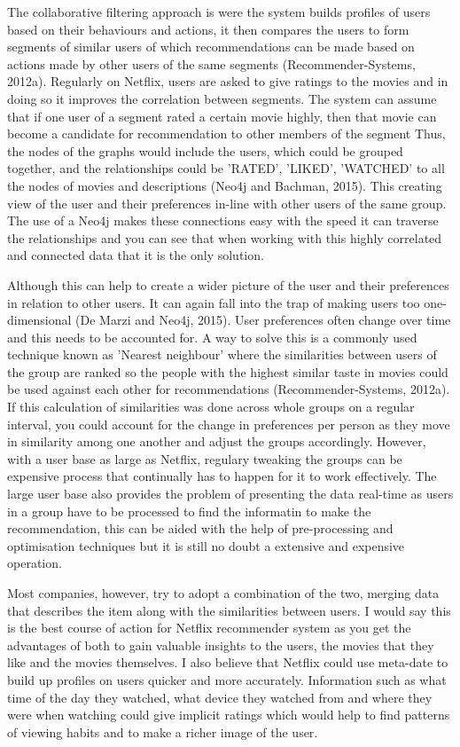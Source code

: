 \documentclass[a4paper]{article}
\begin{document}
The collaborative filtering approach is were the system builds profiles of users based on their behaviours and actions, it then compares the users to form segments of similar users of which recommendations can be made based on actions made by other users of the same segments (Recommender-Systems, 2012a). Regularly on Netflix, users are asked to give ratings to the movies and in doing so it improves the correlation between segments. The system can assume that if one user of a segment rated a certain movie highly, then that movie can become a candidate for recommendation to other members of the segment Thus, the nodes of the graphs would include the users, which could be grouped together, and the relationships could be 'RATED', 'LIKED', 'WATCHED' to all the nodes of movies and descriptions (Neo4j and Bachman, 2015). This creating view of the user and their preferences in-line with other users of the same group. The use of a Neo4j makes these connections easy with the speed it can traverse the relationships and you can see that when working with this highly correlated and connected data that it is the only solution. \par

Although this can help to create a wider picture of the user and their preferences in relation to other users. It can again fall into the trap of making users too one-dimensional (De Marzi and Neo4j, 2015). User preferences often change over time and this needs to be accounted for. A way to solve this is a commonly used technique known as 'Nearest neighbour' where the similarities between users of the group are ranked so the people with the highest similar taste in movies could be used against each other for recommendations (Recommender-Systems, 2012a). If this calculation of similarities was done across whole groups on a regular interval, you could account for the change in preferences per person as they move in similarity among one another and adjust the groups accordingly. However, with a user base as large as Netflix, regulary tweaking the groups can be expensive process that continually has to happen for it to work effectively. The large user base also provides the problem of presenting the data real-time as users in a group have to be processed to find the informatin to make the recommendation, this can be aided with the help of pre-processing and optimisation techniques but it is still no doubt a extensive and expensive operation.

Most companies, however, try to adopt a combination of the two, merging data that describes the item along with the similarities between users. I would say this is the best course of action for Netflix recommender system as you get the advantages of both to gain valuable insights to the users, the movies that they like and the movies themselves. I also believe that Netflix could use meta-date to build up profiles on users quicker and more accurately. Information such as what time of the day they watched, what device they watched from and where they were when watching could give implicit ratings which would help to find patterns of viewing habits and to make a richer image of the user. \par
\end{document}
